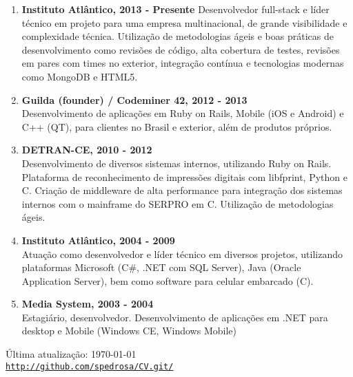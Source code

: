 \documentclass[letterpaper]{article}
\def\footerlink{http://github.com/spedrosa/CV.git/}
\begin{document}
\begin{enumerate}
  \item
  \textbf{Instituto Atlântico, 2013 - Presente}
  Desenvolvedor full-stack e líder técnico em projeto para uma empresa multinacional, de grande visibilidade e complexidade técnica. Utilização de metodologias ágeis e boas práticas de desenvolvimento como revisões de código, alta cobertura de testes, revisões em pares com times no exterior, integração contínua e tecnologias modernas como MongoDB e HTML5.
  \item
  \textbf{Guilda (founder) / Codeminer 42, 2012 - 2013 } \\
  Desenvolvimento de aplicações em Ruby on Rails, Mobile (iOS e Android) e C++ (QT), para clientes no Brasil e exterior, além de produtos próprios.
  \item
  \textbf{DETRAN-CE, 2010 - 2012} \\
  Desenvolvimento de diversos sistemas internos, utilizando Ruby on Rails. Plataforma de reconhecimento de impressões digitais com libfprint, Python e C. Criação de middleware de alta performance para integração dos sistemas internos com o mainframe do SERPRO em C. Utilização de metodologias ágeis.
  \item
  \textbf{Instituto Atlântico, 2004 - 2009 } \\
  Atuação como desenvolvedor e líder técnico em diversos projetos, utilizando plataformas Microsoft (C\#, .NET com SQL Server), Java (Oracle Application Server), bem como software para celular embarcado (C).
  \item
  \textbf{Media System, 2003 - 2004} \\
  Estagiário, desenvolvedor. Desenvolvimento de aplicações em .NET para desktop e Mobile (Windows CE, Windows Mobile)
\end{enumerate}

\bigskip

\begin{center}
  \begin{footnotesize}
    Última atualização: \today \\
    \href{\footerlink}{\texttt{\footerlink}}
  \end{footnotesize}
\end{center}
\end{document}
